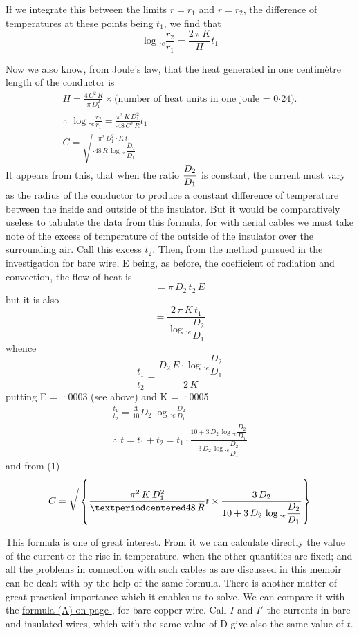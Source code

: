 \documentclass[12pt,oneside]{book}[2021/10/04]
\newcommand{\bigsurd}{\sqrt{\vphantom{\frac{A}{B}}}}
\newcommand{\xp}{\rule[-2.2ex]{0pt}{3.4ex}}
\begin{document}
If we integrate this between the limits \(r = r_{1}\) and \(r = r_{2}\),
the difference of temperatures at these points being \(t_{1}\), we find
that
\[
\log._{e} \frac{r_{2}}{r_{1}} = \frac{2 \,\pi \, K}{H} t_{1}
\]

Now we also know, from Joule's law, that the heat generated
in one centimètre length of the conductor is
\begin{gather*}
H = \frac{4 \,C^2 \,R}{\pi \,D^2_{1}} \times \text{(number of heat units in one joule = 0·24).}\\
\text{∴ } \log._{e} \frac{r_{2}}{r_{1}} = \frac{\pi^2 \, K \, D^2_{1}}{·48 \, C^2 \, R} t_{1}\\
C = \sqrt{ \frac{\pi^2 \, D^2_{1} \cdot K \,t_{1}}{ ·48 \, R \,\log._{e} \dfrac{D_{2}}{D_{1}}}}\tag{1}
\end{gather*}
It appears from this, that when the ratio \(\xp\dfrac{D_{2}}{D_{1}}\) is constant, the current
must vary as the radius of the conductor to produce a constant
difference of temperature between the inside and outside of the
insulator. But it would be comparatively useless to tabulate the
data from this formula, for with aerial cables we must take note
of the excess of temperature of the outside of the insulator over
the surrounding air. Call this excess \(t_{2}\). Then, from the method
pursued in the investigation for bare wire, E being, as before, the
coefficient of radiation and convection, the flow of heat is
\[
= \pi \, D_{2} \,t_{2} \, E
\]
but it is also
\[
= \frac{2 \,\pi \, K \,t_{1}}{\log._{e}\dfrac{D_{2}}{D_{1}}}
\]
whence
\[
\frac{t_{1}}{t_{2}} = \frac{D_{2} \, E \cdot \log._{e} \dfrac{D_{2}}{D_{1}}}{2 \, K}
\]
putting E = ·0003 (see above) and K = ·0005
\begin{gather*}
\frac{t_{1}}{t_{2}} = \frac{3}{10} D_{2} \log._{e} \frac{D_{2}}{D_{1}} \tag{2}\\
\text{∴ } t = t_{1} + t_{2} = t_{1} \cdot \frac{10 + 3 \, D_{2} \, \log._{e} \dfrac{D_{2}}{D_{1}}}{3 \,D_{2} \, \log._{e} \dfrac{D_{2}} {D_{1}}} \tag{3}
\end{gather*}
and from (1)
\[
C = \bigsurd \left\{ \frac{ \pi^2 \, K \, D^2_{1}} {·48 \, R} t \times \frac {3 \, D_{2}}{10 + 3 \, D_{2} \, \log._{e} \dfrac{D_{2}}{D_{1}}} \right\}
\]

This formula is one of great interest. From it we can
calculate directly the value of the current or the rise in temperature,
when the other quantities are fixed; and all the
problems in connection with such cables as are discussed in
this memoir can be dealt with by the help of the same formula.
There is another matter of great practical importance which it
enables us to solve. We can compare it with the \hyperref[eq:a]{formula (A) on
page \pageref{eq:a}}, for bare copper wire. Call \(I\) and \(I'\) the currents in
bare and insulated wires, which with the same value of D give
also the same value of \(t\).
\end{document}

